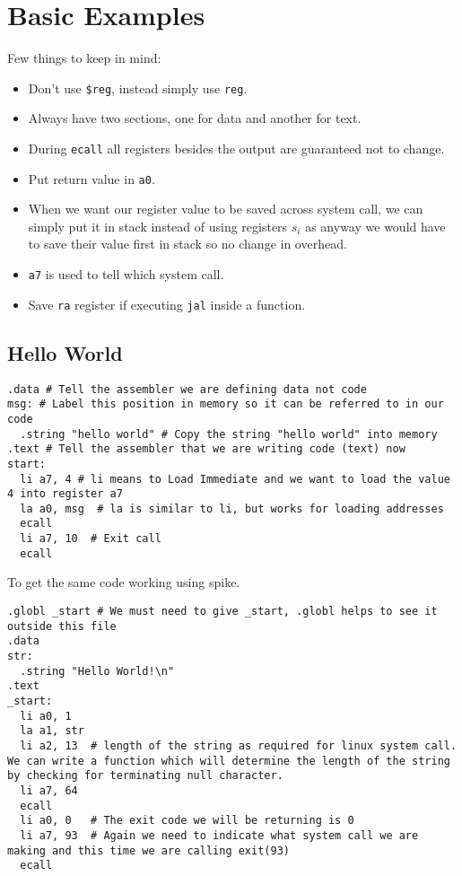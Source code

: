 \section{Basic Examples}

Few things to keep in mind:

\begin{itemize}
	\item Don't use \texttt{\$reg}, instead simply use \texttt{reg}.
	\item Always have two sections, one for data and another for text.
	\item During \texttt{ecall} all registers besides the output are guaranteed not to change.
	\item Put return value in \texttt{a0}.
	\item When we want our register value to be saved across system call, we can simply put it in stack instead of using registers $s_i$ as anyway we would have to save their value first in stack so no change in overhead.
	\item \texttt{a7} is used to tell which system call.
	\item Save \texttt{ra} register if executing \texttt{jal} inside a function.
\end{itemize}

\subsection{Hello World}

\begin{verbatim}
.data # Tell the assembler we are defining data not code
msg: # Label this position in memory so it can be referred to in our code
  .string "hello world" # Copy the string "hello world" into memory 
.text # Tell the assembler that we are writing code (text) now 
start:
  li a7, 4 # li means to Load Immediate and we want to load the value 4 into register a7
  la a0, msg  # la is similar to li, but works for loading addresses
  ecall
  li a7, 10  # Exit call
  ecall
\end{verbatim}

To get the same code working using spike.

\begin{verbatim}
.globl _start # We must need to give _start, .globl helps to see it outside this file
.data 
str:   
  .string "Hello World!\n" 
.text 
_start: 
  li a0, 1   
  la a1, str 
  li a2, 13  # length of the string as required for linux system call. We can write a function which will determine the length of the string by checking for terminating null character.
  li a7, 64  
  ecall 
  li a0, 0   # The exit code we will be returning is 0
  li a7, 93  # Again we need to indicate what system call we are making and this time we are calling exit(93)
  ecall 
\end{verbatim}

